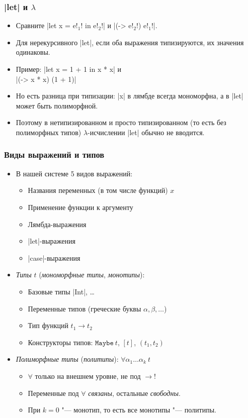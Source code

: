 \documentclass[11pt]{beamer}
\newcommand{\tMaybe}{\mathtt{Maybe}}
\begin{document}
\begin{frame}[fragile]
  \frametitle{\haskinline|let| и $\lambda$}
  \begin{itemize}
    \item Сравните \haskinline|let x = e!$_1$! in e!$_2$!| и \haskinline|(\x -> e!$_2$!) e!$_1$!|.
          \pause
    \item Для нерекурсивного \haskinline|let|, если оба выражения типизируются, их значения одинаковы.\pause
    \item Пример: \haskinline|let x = 1 + 1 in x * x| и\\ \haskinline|(\x -> x * x) (1 + 1)|
          \pause
    \item Но есть разница при типизации: \pause \haskinline|x| в лямбде всегда мономорфна, а в \haskinline|let| может быть полиморфной.
          \pause
    \item Поэтому в нетипизированном и просто типизированном (то есть без полиморфных типов) $\lambda$-исчислении \haskinline|let| обычно не вводится.
  \end{itemize}
\end{frame}

\begin{frame}[fragile]
  \frametitle{Виды выражений и типов}
  \begin{itemize}
    \setlength{\itemsep}{0pt}
    \item В нашей системе 5 видов выражений:\pause
    \begin{itemize}
      \item Названия переменных (в том числе функций) $x$
      \item Применение функции к аргументу
      \item Лямбда-выражения
      \item \haskinline|let|-выражения
      \item \haskinline|case|-выражения
    \end{itemize}
      \pause
    \item \emph{Типы} $t$ (\emph{мономорфные типы}, \emph{монотипы}):
          \pause
    \begin{itemize}
      \item Базовые типы \haskinline|Int|, \ldots
      \item Переменные типов (греческие буквы $\alpha, \beta, \ldots$)
      \item Тип функций $t_1 \to t_2$
      \item Конструкторы типов: $\tMaybe~t$, $[t]$, $(t_1, t_2)$
        \pause
    \end{itemize}
    \item \emph{Полиморфные типы} (\emph{политипы}): $\forall \alpha_1 \ldots \alpha_k~t$
    \begin{itemize}
      \item $\forall$ только на внешнем уровне, не под $\to$!
      \item Переменные под $\forall$ \emph{связаны}, остальные \emph{свободны}.
      \item При $k = 0$ "--- монотип, то есть все монотипы "--- политипы.
    \end{itemize}
  \end{itemize}
\end{frame}
\end{document}

